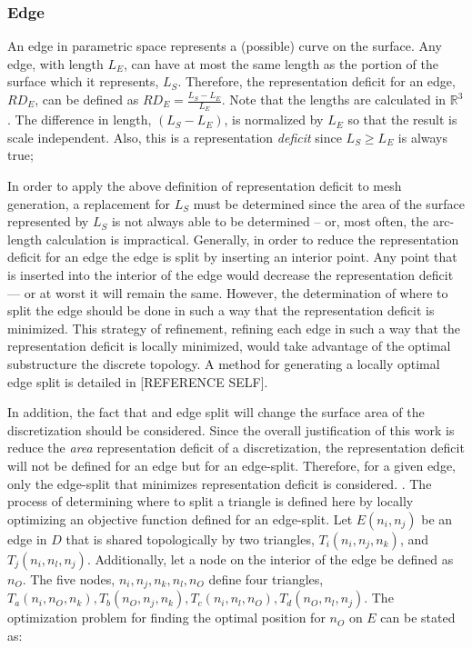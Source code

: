 \documentclass[11pt]{article}
\begin{document}
\subsubsection{Edge}
An edge in parametric space represents a (possible) curve on the
surface. Any edge, with length $L_E$, can have at most the same length
as the portion of the surface which it represents, $L_S$. Therefore, the
representation deficit for an edge, $RD_E$, can be defined as $RD_E =
\frac{L_S - L_E}{L_E}$. Note that the lengths are calculated in
${\mathbb R}^3$. The difference in length, $\left(L_S - L_E\right)$, is
normalized by $L_E$ so that the result is scale independent. Also, this
is a representation {\it deficit} since $L_S \ge L_E$ is always true;

In order to apply the above definition of representation deficit to mesh
generation, a replacement for $L_S$ must be determined since the area of
the surface represented by $L_S$ is not always able to be determined --
or, most often, the arc-length calculation is impractical.
Generally, in order to reduce the representation deficit for an edge 
the edge is split by inserting an interior point. Any point that is
inserted into the interior of the edge would decrease the
representation deficit --- or at worst it will remain the same. However,
the determination of where to split the edge should be done in such
a way that the representation deficit is minimized. This strategy of
refinement, refining each edge in such a way that the representation
deficit is locally minimized,  would take advantage of the optimal
substructure the discrete topology. A method for generating a locally
optimal edge split is detailed in [REFERENCE SELF].

In addition, the fact that and edge split will change the surface area
of the discretization should be considered. Since the overall
justification of this work is reduce the {\it area} representation
deficit of a discretization, the representation deficit will not be
defined for an edge but for an edge-split. Therefore, for a given edge,
only the edge-split that minimizes representation deficit is considered.
. The process of determining where to split a triangle is defined here
by locally optimizing an objective function defined for an edge-split.
Let $E\left(n_i,n_j\right)$ be an edge in $D$ that is shared
topologically by two triangles, $T_i\left(n_i,n_j,n_k\right)$, and
$T_j\left(n_i,n_l,n_j\right)$. Additionally, let a node on the interior
of the edge be defined as $n_O$. The five nodes, $n_i,n_j,n_k,n_l,n_O$
define four triangles, $T_a\left(n_i,n_O,n_k\right), T_b\left(n_O,n_j,
n_k\right), T_c\left(n_i,n_l,n_O\right), T_d\left(n_O,n_l,n_j\right)$.
The optimization problem for finding the optimal position for $n_O$ on
$E$ can be stated as:
\end{document}
